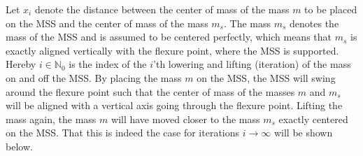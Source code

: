 \documentclass{report}
\numberwithin{tm}{section}
\begin{document}
Let $x_i$ denote the distance between the center of mass of the mass $m$ to be placed on the MSS and the center of mass of the mass $m_s$. The mass $m_s$ denotes the mass of the MSS and is assumed to be centered perfectly, which means that $m_s$ is exactly aligned vertically with the flexure point, where the MSS is supported. Hereby $i \in \mathbb{N}_0$ is the index of the $i$'th lowering and lifting (iteration) of the mass on and off the MSS. By placing the mass $m$ on the MSS, the MSS will swing around the flexure point such that the center of mass of the masses $m$ and $m_s$ will be aligned with a vertical axis going through the flexure point. Lifting the mass again, the mass $m$ will have moved closer to the mass $m_s$ exactly centered on the MSS. That this is indeed the case for iterations $i \rightarrow \infty$ will be shown below.
\end{document}
